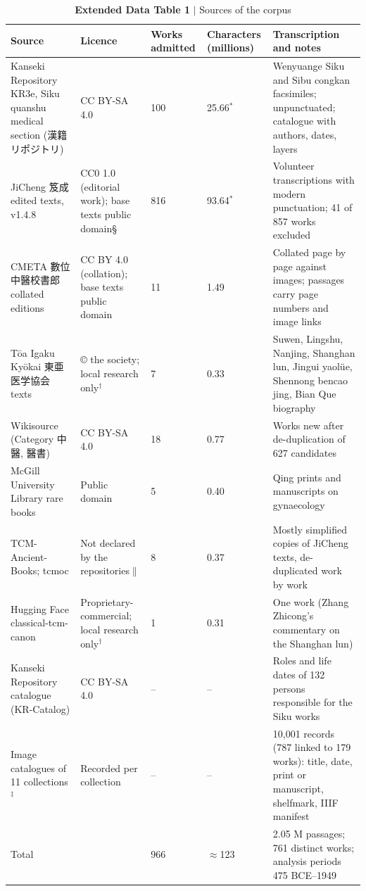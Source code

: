 \begin{table}[t]
\small
\caption{\textbf{Extended Data Table 1} $|$ Sources of the corpus}
\begin{tabular}{lllll}
\toprule
Source & Licence & Works admitted & Characters (millions) & Transcription and notes \\
\midrule
Kanseki Repository KR3e, Siku quanshu medical section (漢籍リポジトリ) & CC BY-SA 4.0 & 100 & 25.66$^{*}$ & Wenyuange Siku and Sibu congkan facsimiles; unpunctuated; catalogue with authors, dates, layers \\
JiCheng 笈成 edited texts, v1.4.8 & CC0 1.0 (editorial work); base texts public domain\S{} & 816 & 93.64$^{*}$ & Volunteer transcriptions with modern punctuation; 41 of 857 works excluded \\
CMETA 數位中醫校書郎 collated editions & CC BY 4.0 (collation); base texts public domain & 11 & 1.49 & Collated page by page against images; passages carry page numbers and image links \\
Tōa Igaku Kyōkai 東亜医学協会 texts & © the society; local research only$^{\dagger}$ & 7 & 0.33 & Suwen, Lingshu, Nanjing, Shanghan lun, Jingui yaolüe, Shennong bencao jing, Bian Que biography \\
Wikisource (Category 中醫, 醫書) & CC BY-SA 4.0 & 18 & 0.77 & Works new after de-duplication of 627 candidates \\
McGill University Library rare books & Public domain & 5 & 0.40 & Qing prints and manuscripts on gynaecology \\
TCM-Ancient-Books; tcmoc & Not declared by the repositories$\|$ & 8 & 0.37 & Mostly simplified copies of JiCheng texts, de-duplicated work by work \\
Hugging Face classical-tcm-canon & Proprietary-commercial; local research only$^{\dagger}$ & 1 & 0.31 & One work (Zhang Zhicong's commentary on the Shanghan lun) \\
Kanseki Repository catalogue (KR-Catalog) & CC BY-SA 4.0 & – & – & Roles and life dates of 132 persons responsible for the Siku works \\
Image catalogues of 11 collections$^{\ddagger}$ & Recorded per collection & – & – & 10,001 records (787 linked to 179 works): title, date, print or manuscript, shelfmark, IIIF manifest \\
\addlinespace
Total &  & 966 & $\approx$123 & 2.05 M passages; 761 distinct works; analysis periods 475 BCE–1949 \\

\end{tabular}
\end{table}

